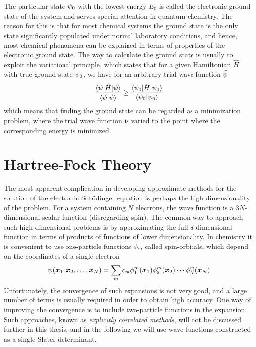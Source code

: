 The particular state $\psi_0$ with the lowest energy $E_0$ is called 
the electronic ground state of the system and serves special attention in quantum chemistry.
The reason for this is that for most chemical systems the ground state is the only state
significantly populated under normal laboratory conditions, and hence, most chemical 
phenomena can be explained in terms of properties of the electronic ground state. The way to
calculate the ground state is usually to exploit the variational principle, which states that
for a given Hamiltonian $\hat{H}$ with true ground state $\psi_0$, we have for an arbitrary
trial wave function $\tilde{\psi}$
\begin{equation}
    \label{eq:var_princ}
    \frac{\langle\tilde{\psi}|\hat{H}|\tilde{\psi}\rangle}
    {\langle\tilde{\psi}|\tilde{\psi}\rangle}
    \geq
    \frac{\langle\psi_0|\hat{H}|\psi_0\rangle}
    {\langle\psi_0|\psi_0\rangle}
\end{equation}
which means that finding the ground state can be regarded as a minimization problem, where
the trial wave function is varied to the point where the corresponding energy is minimized.

\section{Hartree-Fock Theory}\label{sec:HFT}
The most apparent complication in developing approximate methods for the solution of the 
electronic Sch\"{o}dinger equation is perhaps the high dimensionality of the problem. For
a system containing $N$ electrons, the wave function is a $3N$-dimensional scalar function 
(disregarding spin). The common way to approach such high-dimensional problems is by
approximating the full $d$-dimensional function in terms of products of functions of lower 
dimensionality. In chemistry it is convenient to use one-particle functions $\phi_i$, 
called spin-orbitals, which depend on the coordinates of a single electron
\begin{equation}
    \label{eq:orb_exp}
    \psi(\boldsymbol x_1,\boldsymbol x_2,\dots,\boldsymbol x_N) = \sum_m c_m 
	\phi_1^m(\boldsymbol x_1)
	\phi_2^m(\boldsymbol x_2)\cdots
	\phi_N^m(\boldsymbol x_N)
\end{equation}
Unfortunately, the convergence of such expansions is not very good, and a large number
of terms is usually required in order to obtain high accuracy. One way of improving
the convergence is to include two-particle functions in the expansion. Such approaches,
known as \emph{explicitly correlated methods}\cite{klopper,valeev}, will not be discussed
further in this thesis, and in the following we will use wave functions constructed as a 
single Slater determinant.

